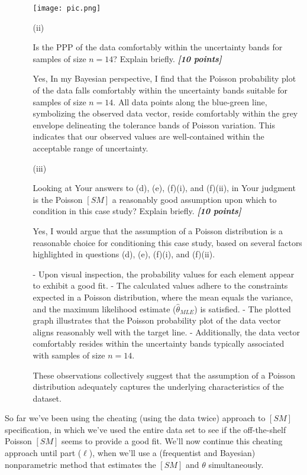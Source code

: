 \documentclass[12pt]{article}
\newcommand{\bi}[1]{\b{\i{#1}}}
\renewcommand{\b}[1]{\textbf{#1}}
\renewcommand{\i}[1]{\textit{#1}}
\begin{document}
\begin{itemize}
\begin{itemize}
\texttt{[image: pic.png]}
\item[(ii)]

Is the PPP of the data comfortably within the uncertainty bands for samples of size $n = 14$? Explain briefly. \bi{[10 points]}

{\color{blue} Yes, In my Bayesian perspective, I find that the Poisson probability plot of the data falls comfortably within the uncertainty bands suitable for samples of size \( n = 14 \). All data points along the blue-green line, symbolizing the observed data vector, reside comfortably within the grey envelope delineating the tolerance bands of Poisson variation. This indicates that our observed values are well-contained within the acceptable range of uncertainty.

}
\item[(iii)]

Looking at Your answers to (d), (e), (f)(i), and (f)(ii), in Your judgment is the Poisson $[SM]$ a reasonably good assumption upon which to condition in this case study? Explain briefly. \bi{[10 points]}

{\color{blue} Yes, I would argue that the assumption of a Poisson distribution is a reasonable choice for conditioning this case study, based on several factors highlighted in questions (d), (e), (f)(i), and (f)(ii).

- Upon visual inspection, the probability values for each element appear to exhibit a good fit.
- The calculated values adhere to the constraints expected in a Poisson distribution, where the mean equals the variance, and the maximum likelihood estimate (\(\hat{\theta}_{MLE}\)) is satisfied.
- The plotted graph illustrates that the Poisson probability plot of the data vector aligns reasonably well with the target line.
- Additionally, the data vector comfortably resides within the uncertainty bands typically associated with samples of size \(n = 14\).

These observations collectively suggest that the assumption of a Poisson distribution adequately captures the underlying characteristics of the dataset.

}
\end{itemize}

\end{itemize}

So far we've been using the cheating (using the data twice) approach to $[ SM ]$ specification, in which we've used the entire data set to see if the off-the-shelf Poisson $[ SM ]$ seems to provide a good fit. We'll now continue this cheating approach until part ($\ell$), when we'll use a (frequentist and Bayesian) nonparametric method that estimates the $[ SM ]$ and $\theta$ simultaneously.
\end{document}
